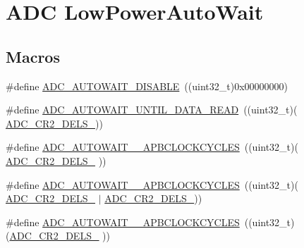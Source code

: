 \hypertarget{group___a_d_c___low_power_auto_wait}{\section{A\-D\-C Low\-Power\-Auto\-Wait}
\label{group___a_d_c___low_power_auto_wait}
}
\subsection*{Macros}
\begin{DoxyCompactItemize}
\item 
\#define \hyperlink{group___a_d_c___low_power_auto_wait_gadae7de88708831899ab8ea2271a0f081}{A\-D\-C\-\_\-\-A\-U\-T\-O\-W\-A\-I\-T\-\_\-\-D\-I\-S\-A\-B\-L\-E}~((uint32\-\_\-t)0x00000000)
\item 
\#define \hyperlink{group___a_d_c___low_power_auto_wait_gaec051a920450fe887e64c6f8437b8001}{A\-D\-C\-\_\-\-A\-U\-T\-O\-W\-A\-I\-T\-\_\-\-U\-N\-T\-I\-L\-\_\-\-D\-A\-T\-A\-\_\-\-R\-E\-A\-D}~((uint32\-\_\-t)(                                  \hyperlink{group___peripheral___registers___bits___definition_ga2675f3571f7d741e309256904cac0e2e}{A\-D\-C\-\_\-\-C\-R2\-\_\-\-D\-E\-L\-S\-\_}))
\item 
\#define \hyperlink{group___a_d_c___low_power_auto_wait_ga5d904bd930133c1825b4091a6ae35d0e}{A\-D\-C\-\_\-\-A\-U\-T\-O\-W\-A\-I\-T\-\_\-\_\-\-A\-P\-B\-C\-L\-O\-C\-K\-C\-Y\-C\-L\-E\-S}~((uint32\-\_\-t)(                 \hyperlink{group___peripheral___registers___bits___definition_ga175b298af75da04802dbf0521e66a01c}{A\-D\-C\-\_\-\-C\-R2\-\_\-\-D\-E\-L\-S\-\_}                 ))
\item 
\#define \hyperlink{group___a_d_c___low_power_auto_wait_gaa4ab3acaf62f7b118176c4fbf559c663}{A\-D\-C\-\_\-\-A\-U\-T\-O\-W\-A\-I\-T\-\_\-\_\-\-A\-P\-B\-C\-L\-O\-C\-K\-C\-Y\-C\-L\-E\-S}~((uint32\-\_\-t)(                 \hyperlink{group___peripheral___registers___bits___definition_ga175b298af75da04802dbf0521e66a01c}{A\-D\-C\-\_\-\-C\-R2\-\_\-\-D\-E\-L\-S\-\_} $\vert$ \hyperlink{group___peripheral___registers___bits___definition_ga2675f3571f7d741e309256904cac0e2e}{A\-D\-C\-\_\-\-C\-R2\-\_\-\-D\-E\-L\-S\-\_}))
\item 
\#define \hyperlink{group___a_d_c___low_power_auto_wait_ga16db726b89bba6df1b04f28b254be192}{A\-D\-C\-\_\-\-A\-U\-T\-O\-W\-A\-I\-T\-\_\-\_\-\-A\-P\-B\-C\-L\-O\-C\-K\-C\-Y\-C\-L\-E\-S}~((uint32\-\_\-t)(\hyperlink{group___peripheral___registers___bits___definition_ga81458a570d3d988d89673b426eebbedd}{A\-D\-C\-\_\-\-C\-R2\-\_\-\-D\-E\-L\-S\-\_}                                  ))

\end{DoxyCompactItemize}

